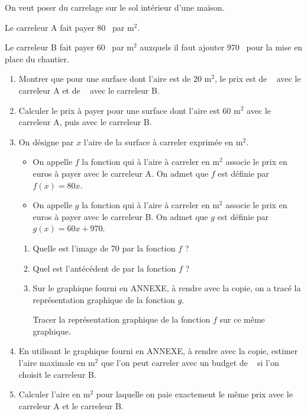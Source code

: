 \documentclass[exercice,a4]{thedocument}%
\begin{document}
%
    \def\euro{\texteuro}%

\medskip

On veut poser du carrelage sur le sol intérieur d'une maison.

\medskip

Le carreleur A fait payer 80~\euro{} par m$^2$.

Le carreleur B fait payer 60~\euro{} par m$^2$ auxquels il faut ajouter 970~\euro{} pour la mise en place du chantier.

\medskip

\begin{enumerate}
\item Montrer que pour une surface dont l’aire est de 20 m$^2$, le prix est de ~\euro{} avec le carreleur A et de ~\euro{} avec le carreleur B.
\item Calculer le prix à payer pour une surface dont l’aire est 60 m$^2$ avec le carreleur A, puis avec le carreleur B.
\item On désigne par $x$ l’aire de la surface à carreler exprimée en m$^2$.

\begin{itemize}[label=$\bullet~$]
\item On appelle $f$ la fonction qui à l’aire à carreler en m$^2$ associe le prix en euros à payer avec
le carreleur A. On admet que $f$ est définie par $f(x) = 80x$.
\item On appelle $g$ la fonction qui à l’aire à carreler en m$^2$ associe le prix en euros à payer avec
le carreleur B. On admet que $g$ est définie par $g(x) = 60x + 970$.
\end{itemize}

	\begin{enumerate}
		\item Quelle est l'image de 70 par la fonction $f$ ?
		\item Quel est l'antécédent de  par la fonction $f$ ?
		\item Sur le graphique fourni en ANNEXE, à rendre avec la copie, on a tracé la représentation graphique de la fonction $g$.

Tracer la représentation graphique de la fonction $f$ sur ce même graphique.
	\end{enumerate}
\item En utilisant le graphique fourni en ANNEXE, à rendre avec la copie, estimer l'aire maximale en m$^2$ que l'on peut carreler avec un budget de ~\euro{} si l'on choisit le carreleur B.
\item Calculer l’aire en m$^2$ pour laquelle on paie exactement le même prix avec le carreleur A et le carreleur B.
\end{enumerate}

\bigskip
\showthesource
\end{document}
